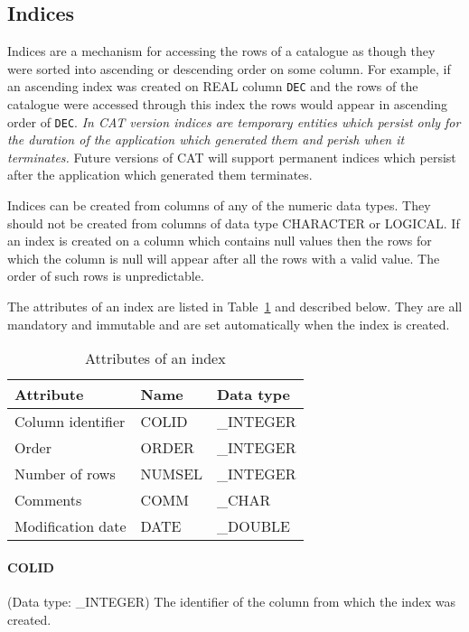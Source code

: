 \subsection{Indices}

Indices are a mechanism for accessing the rows of a catalogue as though
they were sorted into ascending or descending order on some column.  For
example, if an ascending index was created on REAL column {\tt DEC} and
the rows of the catalogue were accessed through this index the rows
would appear in ascending order of {\tt DEC}. {\it In CAT version
\CATversion indices are temporary entities which persist only for the
duration of the application which generated them and perish when it
terminates.} Future versions of CAT will support permanent indices which
persist after the application which generated them terminates.

Indices can be created from columns of any of the numeric data types.
They should not be created from columns of data type CHARACTER or
LOGICAL. If an index is created on a column which contains null values
then the rows for which the column is null will appear after all the
rows with a valid value. The order of such rows is unpredictable.

The attributes of an index are listed in Table~\ref{INDEX_ATT} and 
described below. They are all mandatory and immutable and are set 
automatically when the index is created.

\begin{table}[htbp]

\begin{center}
\begin{tabular}{lll}
Attribute         & Name    & Data type  \\ \hline
Column identifier & COLID   & \_INTEGER  \\
Order             & ORDER   & \_INTEGER  \\
Number of rows    & NUMSEL  & \_INTEGER  \\
Comments          & COMM    & \_CHAR     \\
Modification date & DATE    & \_DOUBLE   \\
\end{tabular}
\end{center}

\caption{\label{INDEX_ATT}Attributes of an index}

\end{table}

\paragraph{COLID}
(Data type: \_INTEGER)
The identifier of the column from which the index was created.

